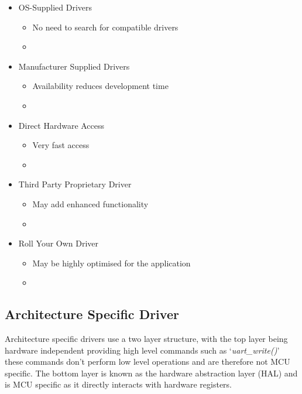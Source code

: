 \begin{itemize}
    \item OS-Supplied Drivers
    \begin{itemize}
        \item {No need to search for compatible drivers}
        \item {} 
    \end{itemize}

    \item Manufacturer Supplied Drivers
    \begin{itemize}
        \item {Availability reduces development time}
        \item {} 
    \end{itemize}
    
    \item Direct Hardware Access
    \begin{itemize}
        \item {Very fast access}
        \item {} 
    \end{itemize}
    
    \item Third Party Proprietary Driver
    \begin{itemize}
        \item {May add enhanced functionality}
        \item {} 
    \end{itemize}
    
    \item Roll Your Own Driver
    \begin{itemize}
        \item {May be highly optimised for the application}
        \item {} 
    \end{itemize}
\end{itemize}

\subsection{Architecture Specific Driver}
Architecture specific drivers use a two layer structure, with the top layer being hardware
independent providing high level commands such as `\textit{uart\_write()}' these commands don't
perform low level operations and are therefore not MCU specific. The bottom layer is known as the
hardware abstraction layer (HAL) and is MCU specific as it directly interacts with hardware
registers.

